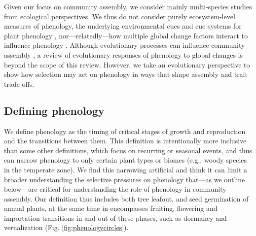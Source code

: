 \documentclass[11pt]{article}
\begin{document}
Given our focus on community assembly, we consider mainly multi-species studies from ecological perspectives. We thus do not consider purely ecosystem-level measures of phenology, the underlying environmental cues and cue systems for plant phenology \citep[e.g.][]{chuine2017process}, nor---relatedly---how multiple global change factors interact to influence phenology \citep[e.g.][]{zhou2023climate}. Although evolutionary processes can influence community assembly \citep{cavender2019diversification}, a review of evolutionary responses of phenology to global changes is beyond the scope of this review. However, we take an evolutionary perspective to show how selection may act on phenology in ways that shape assembly and trait trade-offs.

\subsection*{Defining phenology} 

We define phenology as the timing of critical stages of growth and reproduction and the transitions between them. This definition is intentionally more inclusive than some other definitions, which focus on recurring or seasonal events, and thus can narrow phenology to only certain plant types or biomes (e.g., woody species in the temperate zone). We find this narrowing artificial and think it can limit a broader understanding the selective pressures on phenology that---as we outline below---are critical for understanding the role of phenology in community assembly. Our definition thus includes both tree leafout, and seed germination of annual plants, at the same time in encompasses fruiting, flowering and importation transitions in and out of these phases, such as dormancy and vernalization (Fig. \ref{fig:phenologycircles}). %
\end{document}
